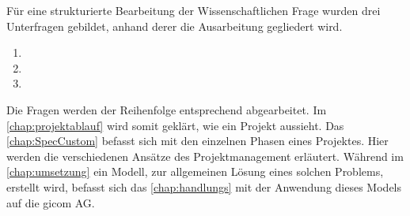 	Für eine strukturierte Bearbeitung der Wissenschaftlichen Frage wurden drei Unterfragen gebildet, anhand derer die Ausarbeitung gegliedert wird. 
	
	\begin{enumerate}
		\item \ersteUnterfrage
		\item \zweireUnterfrage
		\item \dritteUnterfrage
	\end{enumerate}

	Die Fragen werden der Reihenfolge entsprechend abgearbeitet. Im \autoref{chap:projektablauf} wird somit geklärt, wie ein Projekt aussieht. Das \autoref{chap:SpecCustom} befasst sich mit den einzelnen Phasen eines Projektes. Hier werden die verschiedenen Ansätze des Projektmanagement erläutert. Während im \autoref{chap:umsetzung} ein Modell, zur allgemeinen Lösung eines solchen Problems, erstellt wird, befasst sich das \autoref{chap:handlungs} mit der Anwendung dieses Models auf die gicom AG. 
	

	
